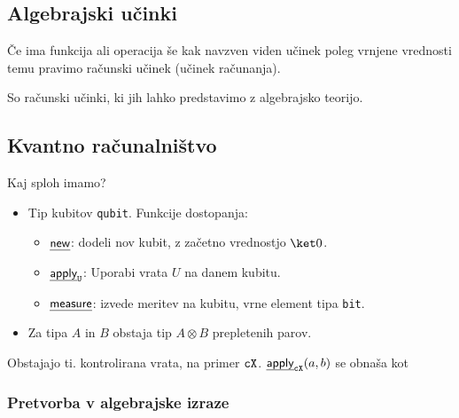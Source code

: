 \documentclass[a4paper,slovene]{article}
\begin{document}
\subsection{Algebrajski učinki}

\begin{definition}
    Če ima funkcija ali operacija še kak navzven viden učinek poleg vrnjene vrednosti temu pravimo računski učinek (učinek računanja).
\end{definition}

\begin{definition}
    So računski učinki, ki jih lahko predstavimo z algebrajsko teorijo.
\end{definition}

\subsection{Kvantno računalništvo}

Kaj sploh imamo?
\begin{itemize}
    \item Tip kubitov \texttt{qubit}. Funkcije dostopanja:
    \begin{itemize}
        \item \(\eff{new}\): dodeli nov kubit, z začetno vrednostjo \(\ket 0\).
        \item \(\eff{apply}_{\g U}\): Uporabi vrata \(U\) na danem kubitu.
        \item \(\eff{measure}\): izvede meritev na kubitu, vrne element tipa \texttt{bit}.
    \end{itemize}
    \item Za tipa \(A\) in \(B\) obstaja tip \(A\otimes B\) prepletenih parov.
\end{itemize}
\begin{example}  %
    Obstajajo ti. kontrolirana vrata, na primer \(\mathtt{cX}\).
    \(\eapply{\ctl X}{a, b}\) se obnaša kot
\end{example}

\subsubsection{Pretvorba v algebrajske izraze}
\end{document}
